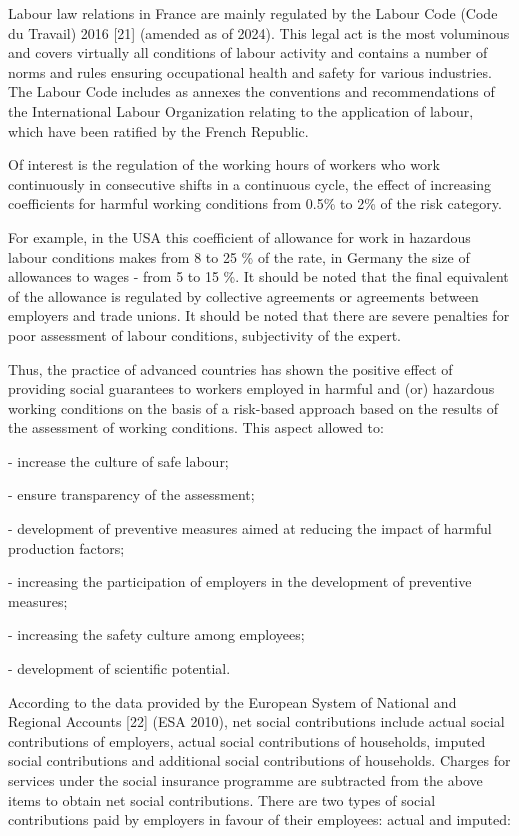 \begin{multicols}{2}
Labour law relations in France are mainly regulated by the Labour Code
(Code du Travail) 2016 {[}21{]} (amended as of 2024). This legal act is
the most voluminous and covers virtually all conditions of labour
activity and contains a number of norms and rules ensuring occupational
health and safety for various industries. The Labour Code includes as
annexes the conventions and recommendations of the International Labour
Organization relating to the application of labour, which have been
ratified by the French Republic.

Of interest is the regulation of the working hours of workers who work
continuously in consecutive shifts in a continuous cycle, the effect of
increasing coefficients for harmful working conditions from 0.5\% to 2\%
of the risk category.

For example, in the USA this coefficient of allowance for work in
hazardous labour conditions makes from 8 to 25 \% of the rate, in
Germany the size of allowances to wages - from 5 to 15 \%. It should be
noted that the final equivalent of the allowance is regulated by
collective agreements or agreements between employers and trade unions.
It should be noted that there are severe penalties for poor assessment
of labour conditions, subjectivity of the expert.

Thus, the practice of advanced countries has shown the positive effect
of providing social guarantees to workers employed in harmful and (or)
hazardous working conditions on the basis of a risk-based approach based
on the results of the assessment of working conditions. This aspect
allowed to:

- increase the culture of safe labour;

- ensure transparency of the assessment;

- development of preventive measures aimed at reducing the impact of
harmful production factors;

- increasing the participation of employers in the development of
preventive measures;

- increasing the safety culture among employees;

- development of scientific potential.

According to the data provided by the European System of National and
Regional Accounts {[}22{]} (ESA 2010), net social contributions include
actual social contributions of employers, actual social contributions of
households, imputed social contributions and additional social
contributions of households. Charges for services under the social
insurance programme are subtracted from the above items to obtain net
social contributions. There are two types of social contributions paid
by employers in favour of their employees: actual and imputed:


\end{multicols}
